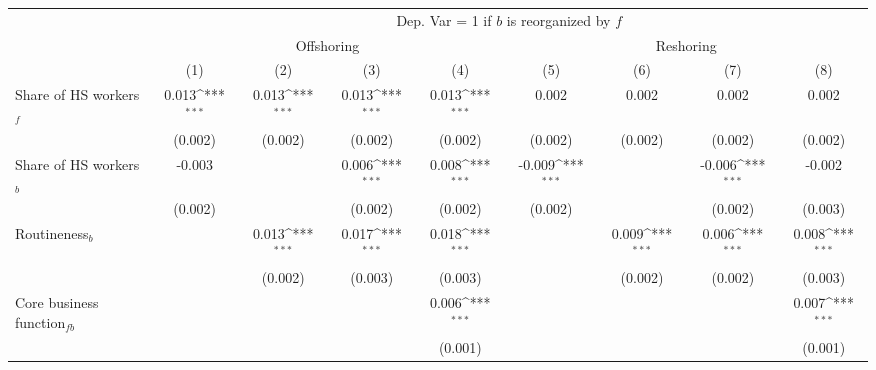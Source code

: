 \begin{table}[htbp] \footnotesize \centering
\def\sym#1{\ifmmode^{#1}\else\(^{#1}\)\fi}
\renewcommand{\arraystretch}{1}
\begin{tabular}{l*{8}{c}}
\toprule
&\multicolumn{8}{c}{Dep. Var = 1 if $ b $ is reorganized by $ f $} \\
\cmidrule(lr){2-9}
                &\multicolumn{4}{c}{Offshoring}                                             &\multicolumn{4}{c}{Reshoring}                                              \\\cmidrule(lr){2-5}\cmidrule(lr){6-9}
                &\multicolumn{1}{c}{(1)}         &\multicolumn{1}{c}{(2)}         &\multicolumn{1}{c}{(3)}         &\multicolumn{1}{c}{(4)}         &\multicolumn{1}{c}{(5)}         &\multicolumn{1}{c}{(6)}         &\multicolumn{1}{c}{(7)}         &\multicolumn{1}{c}{(8)}         \\
\midrule
Share of HS workers$ _f$&    0.013\sym{***}&    0.013\sym{***}&    0.013\sym{***}&    0.013\sym{***}&    0.002         &    0.002         &    0.002         &    0.002         \\
                &  (0.002)         &  (0.002)         &  (0.002)         &  (0.002)         &  (0.002)         &  (0.002)         &  (0.002)         &  (0.002)         \\
\addlinespace
Share of HS workers$ _b$&   -0.003         &                  &    0.006\sym{***}&    0.008\sym{***}&   -0.009\sym{***}&                  &   -0.006\sym{***}&   -0.002         \\
                &  (0.002)         &                  &  (0.002)         &  (0.002)         &  (0.002)         &                  &  (0.002)         &  (0.003)         \\
\addlinespace
Routineness$ _b$&                  &    0.013\sym{***}&    0.017\sym{***}&    0.018\sym{***}&                  &    0.009\sym{***}&    0.006\sym{***}&    0.008\sym{***}\\
                &                  &  (0.002)         &  (0.003)         &  (0.003)         &                  &  (0.002)         &  (0.002)         &  (0.003)         \\
\addlinespace
Core business function$ _{fb}$&                  &                  &                  &    0.006\sym{***}&                  &                  &                  &    0.007\sym{***}\\
                &                  &                  &                  &  (0.001)         &                  &                  &                  &  (0.001)         \\

\end{tabular}
\end{table}
